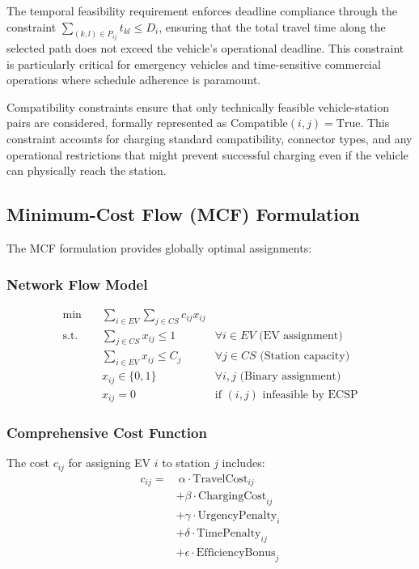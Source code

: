 \documentclass[12pt,a4paper]{article}
\begin{document}
The temporal feasibility requirement enforces deadline compliance through the constraint $\sum_{(k,l) \in P_{ij}} t_{kl} \leq D_i$, ensuring that the total travel time along the selected path does not exceed the vehicle's operational deadline. This constraint is particularly critical for emergency vehicles and time-sensitive commercial operations where schedule adherence is paramount.

Compatibility constraints ensure that only technically feasible vehicle-station pairs are considered, formally represented as $\text{Compatible}(i,j) = \text{True}$. This constraint accounts for charging standard compatibility, connector types, and any operational restrictions that might prevent successful charging even if the vehicle can physically reach the station.

\subsection{Minimum-Cost Flow (MCF) Formulation}

The MCF formulation provides globally optimal assignments:

\subsubsection{Network Flow Model}
\begin{align}
\min \quad &\sum_{i \in EV} \sum_{j \in CS} c_{ij} x_{ij} \\
\text{s.t.} \quad &\sum_{j \in CS} x_{ij} \leq 1 & \forall i \in EV \text{ (EV assignment)} \\
&\sum_{i \in EV} x_{ij} \leq C_j & \forall j \in CS \text{ (Station capacity)} \\
&x_{ij} \in \{0,1\} & \forall i,j \text{ (Binary assignment)} \\
&x_{ij} = 0 & \text{if } (i,j) \text{ infeasible by ECSP}
\end{align}

\subsubsection{Comprehensive Cost Function}
The cost $c_{ij}$ for assigning EV $i$ to station $j$ includes:
\begin{align}
c_{ij} = &\ \alpha \cdot \text{TravelCost}_{ij} \\
&+ \beta \cdot \text{ChargingCost}_{ij} \\
&+ \gamma \cdot \text{UrgencyPenalty}_i \\
&+ \delta \cdot \text{TimePenalty}_{ij} \\
&+ \epsilon \cdot \text{EfficiencyBonus}_j
\end{align}
\end{document}
